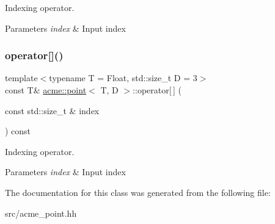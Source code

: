 Indexing operator. 


\begin{DoxyParams}{Parameters}
{\em index} & Input index \\
\hline
\end{DoxyParams}
\mbox{\label{classacme_1_1point_a5e3a5ca9538fcdb337127d27fcecc2b6}} 
\subsubsection{\texorpdfstring{operator[]()}{operator[]()}\hspace{0.1cm}{\footnotesize\ttfamily [2/2]}}
{\footnotesize\ttfamily template$<$typename T = Float, std\+::size\+\_\+t D = 3$>$ \\
const T\& \hyperlink{classacme_1_1point}{acme\+::point}$<$ T, D $>$\+::operator\mbox{[}$\,$\mbox{]} (\begin{DoxyParamCaption}\item[{const std\+::size\+\_\+t \&}]{index }\end{DoxyParamCaption}) const\hspace{0.3cm}{\ttfamily [inline]}}



Indexing operator. 


\begin{DoxyParams}{Parameters}
{\em index} & Input index \\
\hline
\end{DoxyParams}


The documentation for this class was generated from the following file\+:\begin{DoxyCompactItemize}
\item 
src/acme\+\_\+point.\+hh\end{DoxyCompactItemize}
